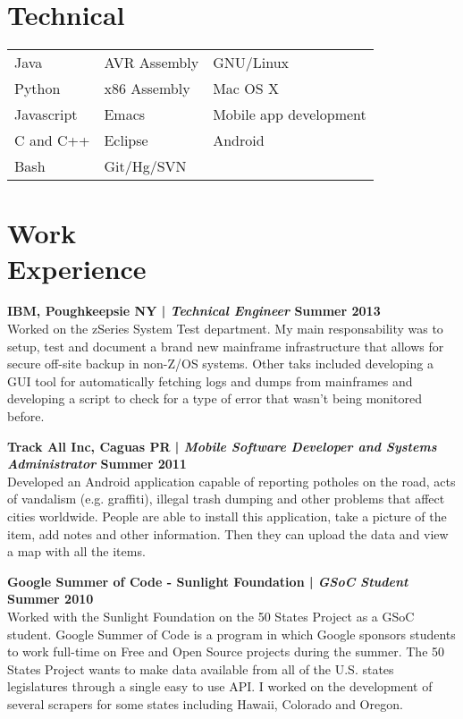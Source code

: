 \documentclass[margin,line]{res}
\begin{document}
\begin{resume}
\section{\sc Technical}
\begin{tabular}{@{}p{2in}p{2in}p{2in}}
 Java           & AVR Assembly  & GNU/Linux  \\
Python   & x86 Assembly & Mac OS X   \\
Javascript & Emacs & Mobile app development \\
C and C++ & Eclipse & Android \\
Bash & Git/Hg/SVN  &
\end{tabular}

\section{\sc Work \\Experience}

{\bf IBM, Poughkeepsie NY | {\em Technical Engineer} \hfill {\bf Summer 2013 \\} }
\vspace{-.01cm}
Worked on the zSeries System Test department. My main responsability was to setup, test and document a brand new mainframe infrastructure that allows for secure off-site backup in non-Z/OS systems. Other taks included developing a GUI tool for automatically fetching logs and dumps from mainframes and developing a script to check for a type of error that wasn't being monitored before.

{\bf Track All Inc, Caguas PR | {\em Mobile Software Developer and Systems Administrator} \hfill {\bf Summer 2011 \\} }
\vspace{-.01cm}
Developed an Android application capable of reporting potholes on the road, acts of vandalism (e.g. graffiti), illegal trash dumping and other problems that affect cities worldwide. People are able to install this application, take a picture of the item, add notes and other information. Then they can upload the data and view a map with all the items.

{\bf Google Summer of Code - Sunlight Foundation | {\em GSoC Student} \hfill {\bf Summer 2010 \\} }
\vspace{-.01cm}
Worked with the Sunlight Foundation on the 50 States Project as a GSoC student. Google Summer of Code is a program in which Google sponsors students to work full-time on Free and Open Source projects during the summer. The 50 States Project wants to make data available from all of the U.S. states legislatures through a single easy to use API. I worked on the development of several scrapers for some states including Hawaii, Colorado and Oregon.



\end{resume}
\end{document}
